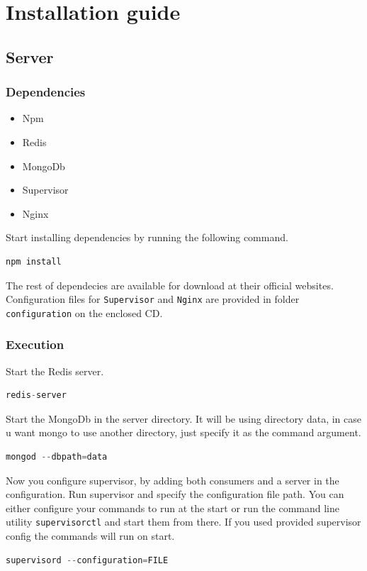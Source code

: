 \documentclass[thesis=M,english]{FITthesis}[2012/10/20]
\begin{document}
\chapter{Installation guide}

\section{Server}

\subsection{Dependencies}
\begin{itemize}
  \item Npm
 \item Redis
  \item MongoDb
  \item Supervisor 
  \item Nginx
\end{itemize}

\noindent
Start installing dependencies by running the following command.
\begin{lstlisting}[language=C, style=nonumbers]
 npm install
\end{lstlisting}

\noindent
The rest of dependecies are available for download at their official websites.
Configuration files for \verb|Supervisor| and \verb|Nginx| are provided in folder \verb|configuration| on the enclosed CD.

\subsection{Execution}
\noindent Start the Redis server.
	\begin{lstlisting}[language=C, style=nonumbers]
	 redis-server
	\end{lstlisting}
	
\noindent Start the MongoDb in the server directory. It will be using directory data, in case u want mongo to use another directory, just specify it as the command argument.
	\begin{lstlisting}[language=C, style=nonumbers]
	 mongod --dbpath=data
	\end{lstlisting}	
	
\noindent Now you configure supervisor, by adding both consumers and a server in the configuration. Run supervisor and specify the configuration file path. You can either configure your commands to run at the start or run the command line utility \verb|supervisorctl| and start them from there. If you used provided supervisor config the commands will run on start.
	\begin{lstlisting}[language=C, style=nonumbers]
	 supervisord --configuration=FILE
	\end{lstlisting}	
		
\end{document}
